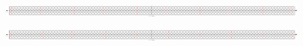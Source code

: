 \documentclass[first,firstsupp,lastsupp,last,hyperref,table]{ETHclass}
\begin{document}
\begin{frame}
\begin{columns}[c]
\begin{column}{0.5\textwidth}
\begin{figure}
\end{figure}
\end{column}
\end{columns}
\centering
\begin{figure}
\centering
\includegraphics[width=1.05\textwidth]{twofibers-sameside-crackshielding11.pdf}
\end{figure}
\vspace{-0.35cm}
\begin{figure}
\centering
\includegraphics[width=1.05\textwidth]{twofibers-oppositeside-crackshielding11.pdf}
\end{figure}
\end{frame}

\addtocounter{framenumber}{-1}
\end{document}

